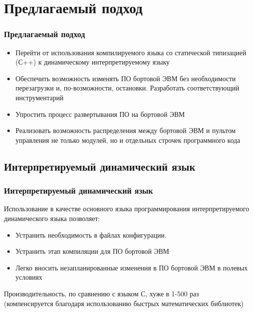 \documentclass{beamer}
\begin{document}
\section{Предлагаемый подход}
\begin{frame}
\frametitle{Предлагаемый подход}
\begin{itemize}
  \item<1>Перейти от использования компилируемого языка со статической
  типизацией (С++) к динамическому интерпретируемому языку
  \item<1>Обеспечить возможность изменять ПО бортовой ЭВМ без необходимости
  перезагрузки и, по-возможности, остановки. Разработать соответствующий
  инструментарий
  \item<1>Упростить процесс развертывания ПО на бортовой ЭВМ
  \item<1>Реализовать возможность распределения между бортовой ЭВМ и пультом
  управления не только модулей, но и отдельных строчек программного кода 
\end{itemize}
\end{frame}

\subsection{Интерпретируемый динамический язык}
\begin{frame}
\frametitle{Интерпретируемый динамический язык}
Использование в качестве основного языка программирования 
интерпретируемого динамического языка позволяет:
\begin{itemize}
  \item<1-> Устранить необходимость в файлах конфигурации.   
  \item<1-> Устранить этап компиляции для ПО бортовой ЭВМ
  \item<1-> Легко вносить незапланированные изменения в ПО бортовой ЭВМ в
  полевых условиях
\end{itemize}
\pause
\alert{Производительность, по сравнению с языком С, хуже в 1-500 раз}
(компенсируется благодаря использованию быстрых математических библиотек)
\end{frame}
\end{document}
